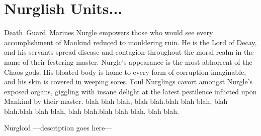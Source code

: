 \documentclass[a4paper]{article}
\begin{document}
 
\section*{Nurglish Units...}

\unit{Death Guard Marines}{
	Nurgle empowers those who would see every accomplishment of Mankind reduced to mouldering ruin.
	He is the Lord of Decay, and his servants spread disease and contagion throughout the moral realm in the name of their festering master.
	Nurgle’s appearance is the most abhorrent of the Chaos gods. His bloated body is home to every form of corruption imaginable, and his skin is covered in weeping sores.
	Foul Nurglings cavort amongst Nurgle’s exposed organs, giggling with insane delight at the latest pestilence inflicted upon Mankind by their master.
	blah blah blah, blah blah.blah blah blah, blah blah.blah blah blah, blah blah.blah blah blah, blah blah.
}
\statsEND


\unit{Nurgloid} {							%
	---description goes here---
}
\statsEND									%
\end{document}
